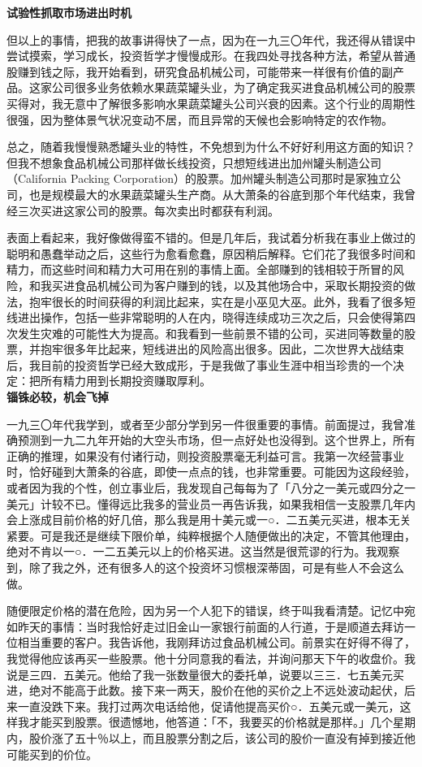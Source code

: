 \documentclass[UTF8,a4paper,zihao=-4,fontset = windows]{ctexart} %
\begin{document}
\textbf{试验性抓取市场进出时机}


但以上的事情，把我的故事讲得快了一点，因为在一九三〇年代，我还得从错误中尝试摸索，学习成长，投资哲学才慢慢成形。在我四处寻找各种方法，希望从普通股赚到钱之际，我开始看到，研究食品机械公司，可能带来一样很有价值的副产品。这家公司很多业务依赖水果蔬菜罐头业，为了确定我买进食品机械公司的股票买得对，我无意中了解很多影响水果蔬菜罐头公司兴衰的因素。这个行业的周期性很强，因为整体景气状况变动不居，而且异常的天候也会影响特定的农作物。

总之，随着我慢慢熟悉罐头业的特性，不免想到为什么不好好利用这方面的知识？但我不想象食品机械公司那样做长线投资，只想短线进出加州罐头制造公司（California Packing Corporation）的股票。加州罐头制造公司那时是家独立公司，也是规模最大的水果蔬菜罐头生产商。从大萧条的谷底到那个年代结束，我曾经三次买进这家公司的股票。每次卖出时都获有利润。

表面上看起来，我好像做得蛮不错的。但是几年后，我试着分析我在事业上做过的聪明和愚蠢举动之后，这些行为愈看愈蠢，原因稍后解释。它们花了我很多时间和精力，而这些时间和精力大可用在别的事情上面。全部赚到的钱相较于所冒的风险，和我买进食品机械公司为客户赚到的钱，以及其他场合中，采取长期投资的做法，抱牢很长的时间获得的利润比起来，实在是小巫见大巫。此外，我看了很多短线进出操作，包括一些非常聪明的人在内，晓得连续成功三次之后，只会使得第四次发生灾难的可能性大为提高。和我看到一些前景不错的公司，买进同等数量的股票，并抱牢很多年比起来，短线进出的风险高出很多。因此，二次世界大战结束后，我目前的投资哲学已经大致成形，于是我做了事业生涯中相当珍贵的一个决定：把所有精力用到长期投资赚取厚利。
\\

\textbf{锱铢必较，机会飞掉}


一九三〇年代我学到，或者至少部分学到另一件很重要的事情。前面提过，我曾准确预测到一九二九年开始的大空头市场，但一点好处也没得到。这个世界上，所有正确的推理，如果没有付诸行动，则投资股票毫无利益可言。我第一次经营事业时，恰好碰到大萧条的谷底，即使一点点的钱，也非常重要。可能因为这段经验，或者因为我的个性，创立事业后，我发现自己每每为了「八分之一美元或四分之一美元」计较不已。懂得远比我多的营业员一再告诉我，如果我相信一支股票几年内会上涨成目前价格的好几倍，那么我是用十美元或一○．二五美元买进，根本无关紧要。可是我还是继续下限价单，纯粹根据个人随便做出的决定，不管其他理由，绝对不肯以一○．一二五美元以上的价格买进。这当然是很荒谬的行为。我观察到，除了我之外，还有很多人的这个投资坏习惯根深蒂固，可是有些人不会这么做。

随便限定价格的潜在危险，因为另一个人犯下的错误，终于叫我看清楚。记忆中宛如昨天的事情：当时我恰好走过旧金山一家银行前面的人行道，于是顺道去拜访一位相当重要的客户。我告诉他，我刚拜访过食品机械公司。前景实在好得不得了，我觉得他应该再买一些股票。他十分同意我的看法，并询问那天下午的收盘价。我说是三四．五美元。他给了我一张数量很大的委托单，说要以三三．七五美元买进，绝对不能高于此数。接下来一两天，股价在他的买价之上不远处波动起伏，后来一直没跌下来。我打过两次电话给他，促请他提高买价○．五美元或一美元，这样我才能买到股票。很遗憾地，他答道：「不，我要买的价格就是那样。」几个星期内，股价涨了五十％以上，而且股票分割之后，该公司的股价一直没有掉到接近他可能买到的价位。
\end{document}
